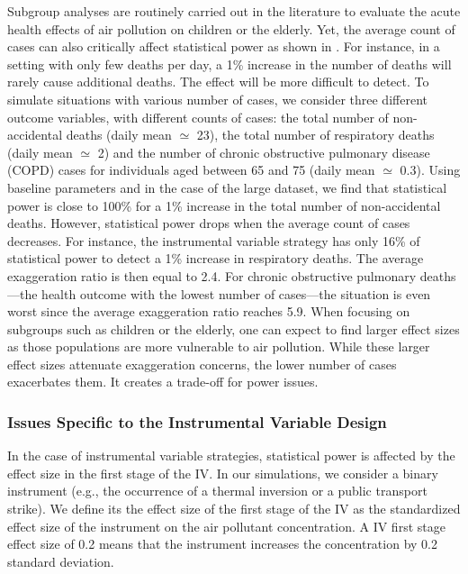 \documentclass[12pt]{article}
\begin{document}
            

            Subgroup analyses are routinely carried out in the literature to evaluate the acute health effects of air pollution on children or the elderly. Yet, the average count of cases can also critically affect statistical power as shown in . For instance, in a setting with only few deaths per day, a 1\% increase in the number of deaths will rarely cause additional deaths. The effect will be more difficult to detect. To simulate situations with various number of cases, we consider three different outcome variables, with different counts of cases: the total number of non-accidental deaths (daily mean $\simeq$ 23), the total number of respiratory deaths (daily mean $\simeq$ 2) and the number of chronic obstructive pulmonary disease (COPD) cases for individuals aged between 65 and 75 (daily mean $\simeq$ 0.3). Using baseline parameters and in the case of the large dataset, we find that statistical power is close to 100\% for a 1\% increase in the total number of non-accidental deaths. However, statistical power drops when the average count of cases decreases. For instance, the instrumental variable strategy has only 16\% of statistical power to detect a 1\% increase in respiratory deaths. The average exaggeration ratio is then equal to 2.4. For chronic obstructive pulmonary deaths---the health outcome with the lowest number of cases---the situation is even worst since the average exaggeration ratio reaches 5.9. When focusing on subgroups such as children or the elderly, one can expect to find larger effect sizes as those populations are more vulnerable to air pollution. While these larger effect sizes attenuate exaggeration concerns, the lower number of cases exacerbates them. It creates a trade-off for power issues.

        \subsubsection*{Issues Specific to the Instrumental Variable Design}
        
            In the case of instrumental variable strategies, statistical power is affected by the effect size in the first stage of the IV. In our simulations, we consider a binary instrument (e.g., the occurrence of a thermal inversion or a public transport strike). We define its the effect size of the first stage of the IV as the standardized effect size of the instrument on the air pollutant concentration. A IV first stage effect size of 0.2 means that the instrument increases the concentration by 0.2 standard deviation. 
            
\end{document}
